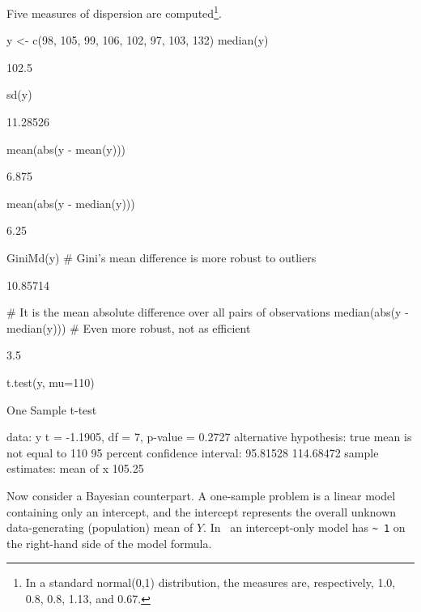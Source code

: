 Five measures of dispersion are computed\footnote{In a standard
  normal(0,1) distribution, the measures are, respectively, 1.0, 0.8,
  0.8, 1.13, and 0.67.}.
\begin{Schunk}
\begin{Sinput}
y <- c(98, 105, 99, 106, 102, 97, 103, 132)
median(y)
\end{Sinput}
\begin{Soutput}
[1] 102.5
\end{Soutput}
\begin{Sinput}
sd(y)
\end{Sinput}
\begin{Soutput}
[1] 11.28526
\end{Soutput}
\begin{Sinput}
mean(abs(y - mean(y)))
\end{Sinput}
\begin{Soutput}
[1] 6.875
\end{Soutput}
\begin{Sinput}
mean(abs(y - median(y)))
\end{Sinput}
\begin{Soutput}
[1] 6.25
\end{Soutput}
\begin{Sinput}
GiniMd(y)   # Gini's mean difference is more robust to outliers
\end{Sinput}
\begin{Soutput}
[1] 10.85714
\end{Soutput}
\begin{Sinput}
 # It is the mean absolute difference over all pairs of observations
median(abs(y - median(y)))   # Even more robust, not as efficient
\end{Sinput}
\begin{Soutput}
[1] 3.5
\end{Soutput}
\begin{Sinput}
t.test(y, mu=110)
\end{Sinput}
\begin{Soutput}

	One Sample t-test

data:  y
t = -1.1905, df = 7, p-value = 0.2727
alternative hypothesis: true mean is not equal to 110
95 percent confidence interval:
  95.81528 114.68472
sample estimates:
mean of x 
   105.25 
\end{Soutput}
\end{Schunk}


Now consider a Bayesian counterpart.  A one-sample problem is a linear
model containing only an intercept, and the intercept represents the
overall unknown data-generating (population) mean of $Y$.  In \R\ an intercept-only model has \verb|~ 1| on
the right-hand side of the model formula.

